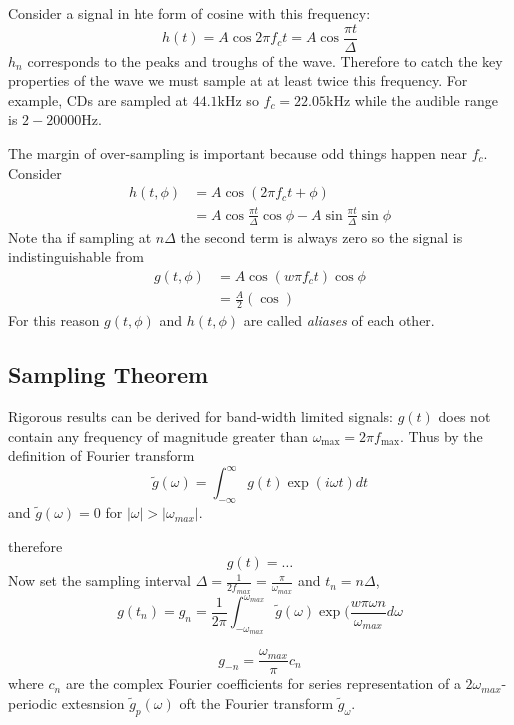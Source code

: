 \documentclass[a4paper]{article}
\newcommand*{\ft}{\tilde}
\begin{document}
Consider a signal in hte form of cosine with this frequency:
\[
  h(t) = A \cos 2\pi f_c t = A \cos \frac{\pi t}{\Delta}
\]
\(h_n\) corresponds to the peaks and troughs of the wave. Therefore to catch the key properties of the wave we must sample at at least twice this frequency. For example, CDs are sampled at \(44.1\)kHz so \(f_c = 22.05\)kHz while the audible range is \(2 - 20000\)Hz.

The margin of over-sampling is important because odd things happen near \(f_c\). Consider
\begin{align*}
  h(t, \phi) &= A \cos (2\pi f_c t + \phi) \\
             &= A \cos \frac{\pi t}{\Delta} \cos \phi - A \sin \frac{\pi t}{\Delta} \sin \phi
\end{align*}
Note tha if sampling at \(n\Delta\) the second term is always zero so the signal is indistinguishable from
\begin{align*}
  g(t, \phi) &= A \cos (w\pi f_c t) \cos \phi \\
             &= \frac{A}{2} \left(\cos \right)
\end{align*}
For this reason \(g(t, \phi)\) and \(h(t, \phi)\) are called \emph{aliases} of each other.

\subsection{Sampling Theorem}

Rigorous results can be derived for band-width limited signals: \(g(t)\) does not contain any frequency of magnitude greater than \(\omega_{\text{max}} = 2\pi f_{\text{max}}\). Thus by the definition of Fourier transform
\[
  \ft g(\omega) = \int_{-\infty}^{\infty} g(t) \exp (i\omega t) dt
\]
and \(\ft g(\omega) = 0\) for \(|\omega| > |\omega_{max}|\).

therefore
\[
  g(t) = \dots
\]
Now set the sampling interval \(\Delta = \frac{1}{2f_{max}} = \frac{\pi}{\omega_{max}}\) and \(t_n = n\Delta\),
\[
  g(t_n) = g_n = \frac{1}{2\pi} \int_{-\omega_{max}}^{\omega_{max}} \ft g(\omega) \exp(\frac{w\pi \omega n}{\omega_{max}} d\omega
\]

\[
  g_{-n} = \frac{\omega_{max}}{\pi} c_n
\]
where \(c_n\) are the complex Fourier coefficients for series representation of a \(2\omega_{max}\)-periodic extesnsion \(\ft g_p(\omega)\) oft the Fourier transform \(\ft g_\omega\).
\end{document}
